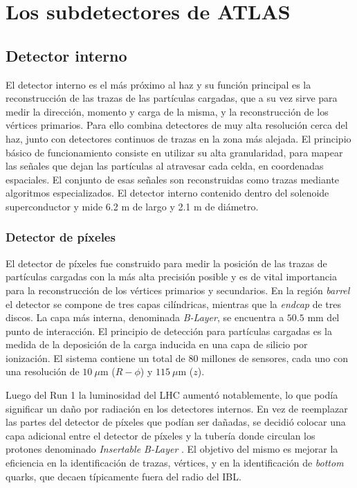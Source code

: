 \section{Los subdetectores de ATLAS}

\subsection{Detector interno}

El detector interno es el más próximo al haz y su función principal es la reconstrucción de las trazas de las partículas cargadas, que a su vez sirve para medir la dirección, momento y carga de la misma, y la reconstrucción de los vértices primarios. Para ello combina detectores de muy alta resolución cerca del haz, junto con detectores continuos de trazas en la zona más alejada. El principio básico de funcionamiento consiste en utilizar su alta granularidad, para mapear las señales que dejan las partículas al atravesar cada celda, en coordenadas espaciales. El conjunto de esas señales son reconstruidas como trazas mediante algoritmos especializados. El detector interno contenido dentro del solenoide superconductor y mide 6.2 m de largo y 2.1 m de diámetro. 

\subsubsection{Detector de píxeles}

El detector de píxeles fue construido para medir la posición de las trazas de partículas cargadas con la más alta precisión posible y es de vital importancia para la reconstrucción de los vértices primarios y secundarios. En la región \textit{barrel} el detector se compone de tres capas cilíndricas, mientras que la \textit{endcap} de tres discos. La capa más interna, denominada \textit{B-Layer}, se encuentra a $50.5$ mm del punto de interacción. El principio de detección para partículas cargadas es la medida de la deposición de la carga inducida en una capa de silicio por ionización. El sistema contiene un total de $80$ millones de sensores, cada uno con una resolución de $10\:\mu$m ($R-\phi$) y $115\:\mu$m ($z$).

Luego del Run 1 la luminosidad del LHC aumentó notablemente, lo que podía significar un daño por radiación en los detectores internos. En vez de reemplazar las partes del detector de píxeles que podían ser dañadas, se decidió colocar una capa adicional entre el detector de píxeles y la tubería donde circulan los protones denominado \textit{Insertable B-Layer} \cite{ATLAS-TDR-2010-19}. El objetivo del mismo es mejorar la eficiencia en la identificación de trazas, vértices, y en la identificación de \textit{bottom} quarks, que decaen típicamente fuera del radio del IBL.

